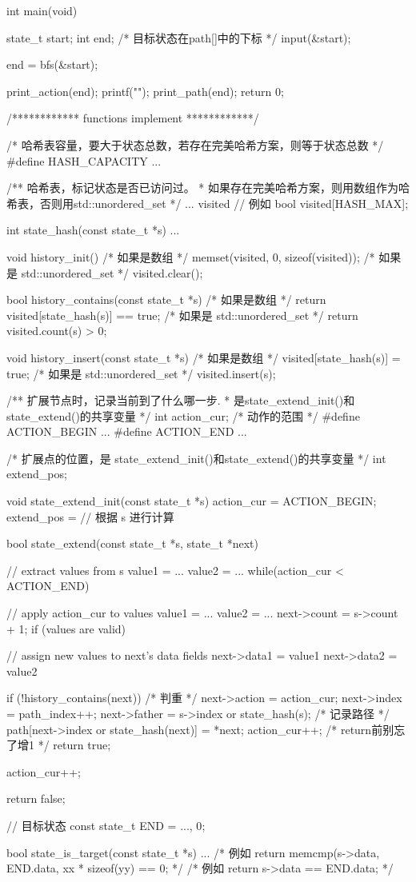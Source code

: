 \begin{Codex}[label=bfs_template.c]
int main(void) {
    state_t start;
    int end; /* 目标状态在path[]中的下标 */
    input(&start);

    end = bfs(&start);

    print_action(end);
    printf("\n");
    print_path(end);
    return 0;
}

/************ functions implement ************/

/* 哈希表容量，要大于状态总数，若存在完美哈希方案，则等于状态总数 */
#define HASH_CAPACITY ...

/** 哈希表，标记状态是否已访问过。
 * 如果存在完美哈希方案，则用数组作为哈希表，否则用std::unordered_set
 */
... visited
// 例如 bool visited[HASH_MAX];

int state_hash(const state_t *s) {
    ...
}

void history_init() {
    /* 如果是数组 */
    memset(visited, 0, sizeof(visited));
    /* 如果是 std::unordered_set */
    visited.clear();
}

bool history_contains(const state_t *s) {
    /* 如果是数组 */
    return visited[state_hash(s)] == true;
    /* 如果是 std::unordered_set */
    return visited.count(s) > 0;
}

void history_insert(const state_t *s) {
    /* 如果是数组 */
    visited[state_hash(s)] = true;
    /* 如果是 std::unordered_set */
    visited.insert(s);
}

/** 扩展节点时，记录当前到了什么哪一步.
 * 是state_extend_init()和state_extend()的共享变量
 */
int action_cur;
/* 动作的范围 */
#define ACTION_BEGIN ...
#define ACTION_END ...

/* 扩展点的位置，是 state_extend_init()和state_extend()的共享变量 */
int extend_pos;

void state_extend_init(const state_t *s) {
    action_cur = ACTION_BEGIN;
    extend_pos = // 根据 s 进行计算
}

bool state_extend(const state_t *s, state_t *next) {
    // extract values from s
    value1 = ...
    value2 = ...
    while(action_cur < ACTION_END) {
        // apply action_cur to values
        value1 = ...
        value2 = ...
        next->count = s->count + 1;
        if (values are valid) {
            // assign new values to next's data fields
            next->data1 = value1
            next->data2 = value2

            if (!history_contains(next)) { /* 判重 */
                next->action = action_cur;
                next->index = path_index++;
                next->father = s->index or state_hash(s);
                /* 记录路径 */
                path[next->index or state_hash(next)] = *next;
                action_cur++;  /* return前别忘了增1 */
                return true;
            }
        }
        action_cur++;
    }
    return false;
}

// 目标状态
const state_t END = {..., 0};

bool state_is_target(const state_t *s) {
    ...
    /* 例如 return memcmp(s->data, END.data, xx * sizeof(yy) == 0; */
    /* 例如 return s->data == END.data; */
}
\end{Codex}

